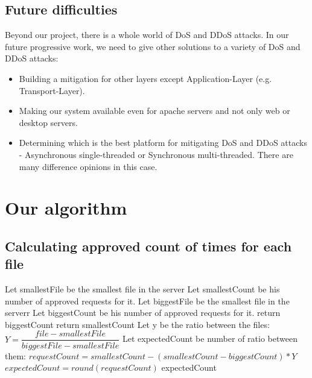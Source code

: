 \documentclass{report}
\begin{document}
\section {Future difficulties}
Beyond our project, there is a whole world of \gls{DoS} and \gls{DDoS} attacks. In our future progressive work, we need to give other solutions to a variety of \gls{DoS} and \gls{DDoS} attacks:
\begin{itemize}
\item Building a mitigation for other layers except Application-Layer (e.g. Transport-Layer).
\item Making our system available even for apache servers and not only web or desktop servers.
\item Determining which is the best platform for mitigating \gls{DoS} and \gls{DDoS} attacks - \hfill \break Asynchronous single-threaded or Synchronous multi-threaded. There are many difference opinions in this case.
\end{itemize}
\newpage
\chapter {Our algorithm}
\section {Calculating approved count of times for each file}
\label{sec:algo1}
  \begin{algorithm}
   \caption{}
    \begin{algorithmic}[1]
        	\State Let smallestFile be the smallest file in the server
	\State Let smallestCount be his number of approved requests for it.
	\State Let biggestFile be the smallest file in the serverr
	\State Let biggestCount be his number of approved requests for it.
                 \State \Return return biggestCount
                \State \Return return smallestCount
            \Else
              	\State Let y be the ratio between the files: $Y=\dfrac{file-smallestFile}{biggestFile - smallestFile} $
	 	\State Let expectedCount be number of ratio between them:
  		\State $requestCount=smallestCount-  {(smallestCount-biggestCount)*Y}$
		\State $expectedCount = round( requestCount )$
	  	\State \Return expectedCount
            \EndIf
       \EndFunction
\end{algorithmic}
\end{algorithm}
\newpage
\end{document}
